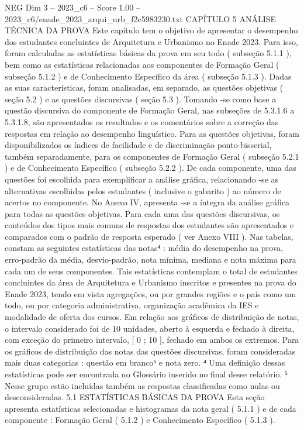 \begin{textsample}{NEG Dim 3 – 2023\_c6 – Score 1.00 – 2023\_c6/enade\_2023\_arqui\_urb\_f2c5983230.txt}  \label{ex:f3_neg_180}
CAPÍTULO 5 ANÁLISE TÉCNICA DA PROVA Este capítulo tem o objetivo de apresentar o desempenho dos estudantes concluintes de Arquitetura e Urbanismo no Enade 2023.
Para isso, foram calculadas as estatísticas básicas da prova em seu todo ( subseção 5.1.1 ), bem como as estatísticas relacionadas aos componentes de Formação Geral ( subseção 5.1.2 ) e de Conhecimento Específico da área ( subseção 5.1.3 ).
Dadas as suas características, foram analisadas, em separado, as questões objetivas ( seção 5.2 ) e as questões discursivas ( seção 5.3 ).
Tomando -se como base a questão discursiva do componente de Formação Geral, nas subseções de 5.3.1.6 a 5.3.1.8, são apresentados os resultados e os comentários sobre a correção das respostas em relação ao desempenho linguístico.
Para as questões objetivas, foram disponibilizados os índices de facilidade e de discriminação ponto-bisserial, também separadamente, para os componentes de Formação Geral ( subseção 5.2.1 ) e de Conhecimento Específico ( subseção 5.2.2 ).
De cada componente, uma das questões foi escolhida para exemplificar a análise gráfica, relacionando -se as alternativas escolhidas pelos estudantes ( inclusive o gabarito ) ao número de acertos no componente.
No Anexo IV, apresenta -se a íntegra da análise gráfica para todas as questões objetivas.
Para cada uma das questões discursivas, os conteúdos dos tipos mais comuns de respostas dos estudantes são apresentados e comparados com o padrão de resposta esperado ( ver Anexo VIII ).
Nas tabelas, constam as seguintes estatísticas das notas⁴ : média do desempenho na prova, erro-padrão da média, desvio-padrão, nota mínima, mediana e nota máxima para cada um de seus componentes.
Tais estatísticas contemplam o total de estudantes concluintes da área de Arquitetura e Urbanismo inscritos e presentes na prova do Enade 2023, tendo em vista agregações, ou por grandes regiões e o país como um todo, ou por categoria administrativa, organização acadêmica da IES e modalidade de oferta dos cursos.
Em relação aos gráficos de distribuição de notas, o intervalo considerado foi de 10 unidades, aberto à esquerda e fechado à direita, com exceção do primeiro intervalo, [ 0 ; 10 ], fechado em ambos os extremos.
Para os gráficos de distribuição das notas das questões discursivas, foram consideradas mais duas categorias : questão em branco⁵ e nota zero. ⁴ Uma definição dessas estatísticas pode ser encontrada no Glossário inserido no final desse relatório. ⁵ Nesse grupo estão incluídas também as respostas classificadas como nulas ou desconsideradas. 5.1 ESTATÍSTICAS BÁSICAS DA PROVA Esta seção apresenta estatísticas selecionadas e histogramas da nota geral ( 5.1.1 ) e de cada componente : Formação Geral ( 5.1.2 ) e Conhecimento Específico ( 5.1.3 ).

\end{textsample}
